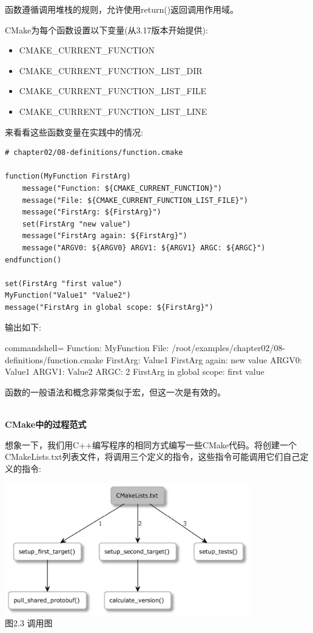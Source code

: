 函数遵循调用堆栈的规则，允许使用return()返回调用作用域。

CMake为每个函数设置以下变量(从3.17版本开始提供):

\begin{itemize}
\item 
CMAKE\_CURRENT\_FUNCTION

\item 
CMAKE\_CURRENT\_FUNCTION\_LIST\_DIR

\item 
CMAKE\_CURRENT\_FUNCTION\_LIST\_FILE

\item 
CMAKE\_CURRENT\_FUNCTION\_LIST\_LINE
\end{itemize}

来看看这些函数变量在实践中的情况:

\begin{lstlisting}[style=styleCMake]
# chapter02/08-definitions/function.cmake

function(MyFunction FirstArg)
	message("Function: ${CMAKE_CURRENT_FUNCTION}")
	message("File: ${CMAKE_CURRENT_FUNCTION_LIST_FILE}")
	message("FirstArg: ${FirstArg}")
	set(FirstArg "new value")
	message("FirstArg again: ${FirstArg}")
	message("ARGV0: ${ARGV0} ARGV1: ${ARGV1} ARGC: ${ARGC}")
endfunction()

set(FirstArg "first value")
MyFunction("Value1" "Value2")
message("FirstArg in global scope: ${FirstArg}")
\end{lstlisting}

输出如下:

\begin{tcblisting}{commandshell={}}
Function: MyFunction
File: /root/examples/chapter02/08-definitions/function.cmake
FirstArg: Value1
FirstArg again: new value
ARGV0: Value1 ARGV1: Value2 ARGC: 2
FirstArg in global scope: first value
\end{tcblisting}

函数的一般语法和概念非常类似于宏，但这一次是有效的。

\hspace*{\fill} \\ %
\noindent
\textbf{CMake中的过程范式}

想象一下，我们用C++编写程序的相同方式编写一些CMake代码。将创建一个CMakeLists.txt列表文件，将调用三个定义的指令，这些指令可能调用它们自己定义的指令:

\begin{center}
\includegraphics[width=0.8\textwidth]{content/1/chapter2/images/3.jpg}\\
图2.3 调用图
\end{center}


